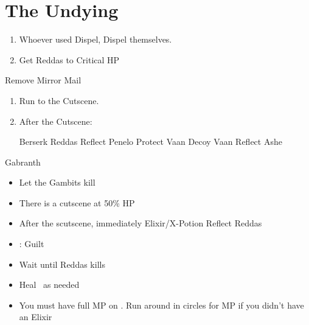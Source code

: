 \chapter{The Undying}
\begin{enumerate}
	\item Whoever used Dispel, Dispel themselves.
	\item Get Reddas to Critical HP
	\begin{itemize}
	\end{itemize}
\end{enumerate}
\begin{equip}\begin{itemize}\vaanf Remove Mirror Mail\end{itemize}\end{equip}
\begin{enumerate}[resume]
\item Run to the Cutscene.
\item After the Cutscene:
\begin{enumerate}
	\penelof Berserk Reddas
	\penelof Reflect Penelo
	\vaanf Protect Vaan
	\ashef Decoy Vaan
	\ashef Reflect Ashe
	\gambiton{\ashe}
\end{enumerate}
\end{enumerate}
\begin{equip}
\begin{itemize}
\optimize{\vaan, \penelo, \ashe}
\end{itemize}
\end{equip}
\begin{gambit}
	\begin{itemize}
	\end{itemize}
\end{gambit}
\begin{battle}{Gabranth}
\begin{itemize}
\item Let the Gambits kill
\item There is a cutscene at 50\% HP
\item After the scutscene, immediately Elixir/X-Potion \vaan
\penelof Reflect Reddas
\item {}: Guilt
\item Wait until Reddas kills
\item Heal \vaan\ as needed
\item You must have full MP on \vaan. Run around in circles for MP if you didn't have an Elixir
\end{itemize}
\end{battle}
